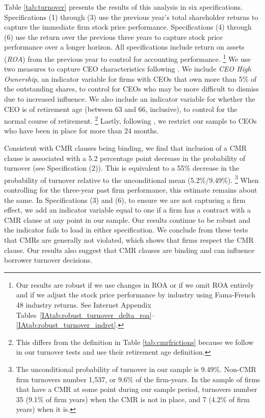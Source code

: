 \documentclass[a4paper,12pt]{article}
\begin{document}
Table \ref{tab:turnover} presents the results of this analysis in six specifications.
Specifications (1) through (3) use the previous year's total shareholder returns to capture the immediate firm stock price performance.
Specifications (4) through (6) use the return over the previous three years to capture stock price performance over a longer horizon.
All specifications include return on assets (\textit{ROA}) from the previous year to control for accounting performance.%
    \footnote{Our results are robust if we use changes in ROA or if we omit ROA entirely and if we adjust the stock price performance by industry using Fama-French 48 industry returns. See Internet Appendix Tables~\ref{IAtab:robust_turnover_delta_roa}--\ref{IAtab:robust_turnover_indret}.} 
We use two measures to capture CEO characteristics following \cite{Jenter_2015}.
We include \textit{CEO High Ownership}, an indicator variable for firms with CEOs that own more than 5\% of the outstanding shares, to control for CEOs who may be more difficult to dismiss due to increased influence.
We also include an indicator variable for whether the CEO is of retirement age (between 63 and 66, inclusive), to control for the normal course of retirement.
    \footnote{This differs from the definition in Table \ref{tab:cmrfrictions} because we follow \cite{Jenter_2015} in our turnover tests and use their retirement age definition.}
Lastly, following \cite{Jenter_2015}, we restrict our sample to CEOs who have been in place for more than 24 months.


Consistent with CMR clauses being binding, we find that inclusion of a CMR clause is associated with a 5.2 percentage point decrease in the probability of turnover (see Specification (2)).
This is equivalent to a 55\%  decrease in the probability of turnover relative to the unconditional mean (5.2\%/9.49\%).
  \footnote{The unconditional probability of turnover in our sample is 9.49\%.
  Non-CMR firm turnovers number 1,537, or 9.6\% of the firm-years.
  In the sample of firms that have a CMR at some point during our sample period, turnovers number 35 (9.1\% of firm years) when the CMR is not in place, and 7 (4.2\% of firm years) when it is.}
When controlling for the three-year past firm performance, this estimate remains about the same.
In Specifications (3) and (6), to ensure we are not capturing a firm effect, we add an indicator variable equal to one if a firm has a contract with a CMR clause at any point in our sample.
Our results continue to be robust and the indicator fails to load in either specification.
We conclude from these tests that CMRs are generally not violated, which shows that firms respect the CMR clause.
Our results also suggest that CMR clauses are binding and can influence borrower turnover decisions.
\end{document}
